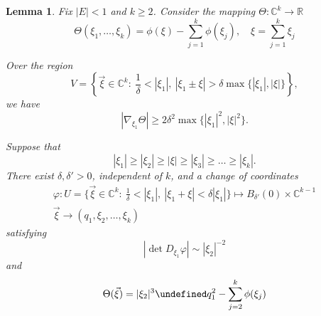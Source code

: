 \documentclass[a4paper,
11pt,  reqno]{amsart}
\newcommand{\5}{\textup{V}}
\newcommand{\noi}{\noindent}
\newtheorem{lemma}[theorem]{Lemma}
\theoremstyle{remark}
\newcommand{\R}{\mathbb{R}}
\newcommand{\CC}{\mathbb{C}}
\let\Re=\undefined\DeclareMathOperator*{\Re}{Re}
\numberwithin{equation}{section}
\numberwithin{theorem}{section}
\begin{document}
\begin{lemma}\label{lem:prop_resonance}
Fix $|E|<1$ and $k\ge 2$. Consider the mapping $\Theta:\CC^{k}\to \R$
$$
\Theta(\xi_1,\dots, \xi_{k})= \phi(\xi)-\sum_{j=1}^k \phi(\xi_j),\quad \xi=\sum_{j=1}^{k} \xi_j
$$

\noi{\rm (i)} Over the region
\begin{equation}
V=\left\{\vec{\xi}\in \CC^{k} :\  \frac{1}{\delta}<|\xi_1|,\  |\xi_1\pm\xi|>\delta\max\{|\xi_1|, |\xi|\}\right\},
\end{equation}
we have
$$
|\nabla_{\xi_1}\Theta|\ge 2\delta^2\max\{|\xi_1|^2, |\xi|^2\}.
$$


\noi{\rm (ii)} Suppose that
$$
|\xi_1|\ge |\xi_2| \ge |\xi|\ge |\xi_3|\ge \dots \ge |\xi_k|.
$$
There exist $\delta, \delta'>0$, independent of $k$, and a change of coordinates
\begin{align*}
\varphi:U=\{\vec{\xi}\in \CC^{k} :\  \frac{1}{\delta}<|\xi_1|,\  |\xi_1+\xi|<\delta|\xi_1|\} \mapsto B_{\delta'}(0)\times \CC^{k-1}\\ \vec{\xi} \to (q_1, \xi_2, \dots, \xi_k)
\end{align*}
satisfying
\begin{equation}\label{eq:nondeg}
|\det D_{\xi_1}\varphi| \sim |\xi_2|^{-2}
\end{equation}
and
$$
\Theta(\vec{\xi})=|\xi_2|^3\Re q_1^2 - \sum_{j=2}^k \phi(\xi_j)
$$

\end{lemma}
\end{document}
